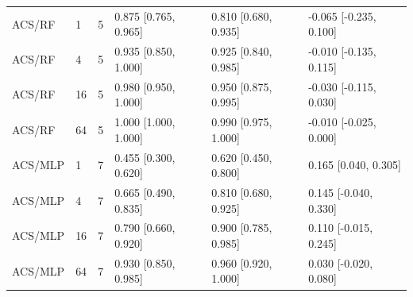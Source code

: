 \begin{tabular}{llllll}
ACS/RF & 1 & 5 & 0.875 [0.765, 0.965] & 0.810 [0.680, 0.935] & -0.065 [-0.235, 0.100] \\
ACS/RF & 4 & 5 & 0.935 [0.850, 1.000] & 0.925 [0.840, 0.985] & -0.010 [-0.135, 0.115] \\
ACS/RF & 16 & 5 & 0.980 [0.950, 1.000] & 0.950 [0.875, 0.995] & -0.030 [-0.115, 0.030] \\
ACS/RF & 64 & 5 & 1.000 [1.000, 1.000] & 0.990 [0.975, 1.000] & -0.010 [-0.025, 0.000] \\
ACS/MLP & 1 & 7 & 0.455 [0.300, 0.620] & 0.620 [0.450, 0.800] & 0.165 [0.040, 0.305] \\
ACS/MLP & 4 & 7 & 0.665 [0.490, 0.835] & 0.810 [0.680, 0.925] & 0.145 [-0.040, 0.330] \\
ACS/MLP & 16 & 7 & 0.790 [0.660, 0.920] & 0.900 [0.785, 0.985] & 0.110 [-0.015, 0.245] \\
ACS/MLP & 64 & 7 & 0.930 [0.850, 0.985] & 0.960 [0.920, 1.000] & 0.030 [-0.020, 0.080] \\
\bottomrule
\end{tabular}
\endgroup
